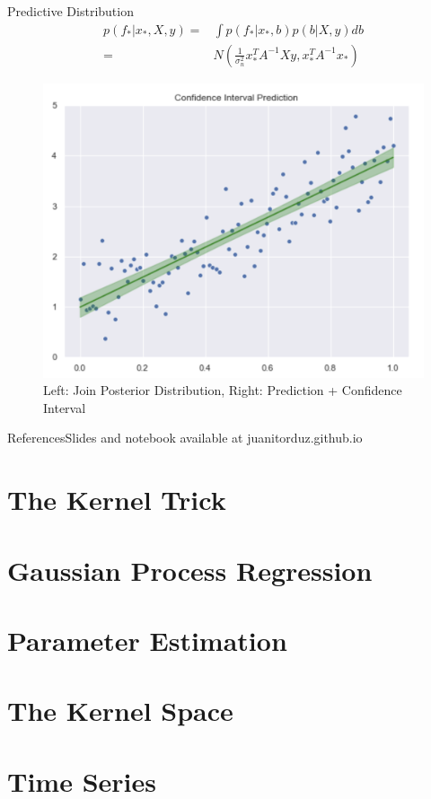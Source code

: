 \documentclass[10pt]{beamer}
\begin{document}
\begin{frame}{Predictive Distribution}
\begin{align*}
p(f_*|x_*, X, y) 
=& \int p(f_*|x_*, b)p(b|X, y)db \\
=& N\left(\frac{1}{\sigma_n^2}x_*^T A^{-1}Xy, x_*^T A^{-1}x_*\right)
\end{align*}

\begin{center}
\begin{figure}
\includegraphics[scale=0.18]{images/lin_prediction.png} 
\caption{Left: Join Posterior Distribution, Right: Prediction + Confidence Interval}
\end{figure}
\end{center}
\end{frame}

\begin{frame}{References}{Slides and notebook available at juanitorduz.github.io}

 
\end{frame}

\section{The Kernel Trick}

\section{Gaussian Process Regression}

\section{Parameter Estimation}

\section{The Kernel Space}

\section{Time Series}
\end{document}
